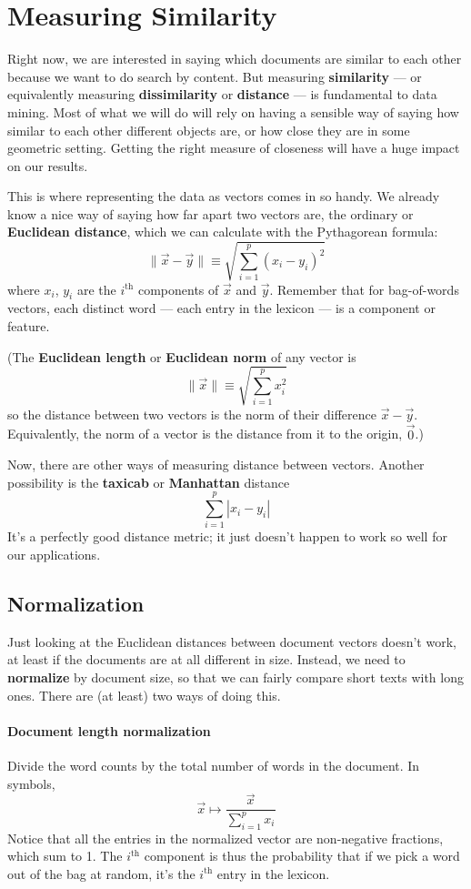 \documentclass{article}
\begin{document}
\section{Measuring Similarity}

Right now, we are interested in saying which documents are similar to each
other because we want to do search by content.  But measuring {\bf similarity}
--- or equivalently measuring {\bf dissimilarity} or {\bf distance} --- is
fundamental to data mining.  Most of what we will do will rely on having a
sensible way of saying how similar to each other different objects are, or how
close they are in some geometric setting.  Getting the right measure of
closeness will have a huge impact on our results.

This is where representing the data as vectors comes in so handy.  We already
know a nice way of saying how far apart two vectors are, the ordinary or {\bf
  Euclidean distance}, which we can calculate with the Pythagorean formula:
\[
\| \vec{x} - \vec{y} \| \equiv \sqrt{\sum_{i=1}^{p}{{\left(x_i - y_i\right)}^2}}
\]
where $x_i$, $y_i$ are the $i^{\mathrm{th}}$ components of $\vec{x}$ and
$\vec{y}$.  Remember that for bag-of-words vectors, each distinct word --- each
entry in the lexicon --- is a component or feature.

(The {\bf Euclidean length} or {\bf Euclidean norm} of any vector is
\[
\| \vec{x} \| \equiv \sqrt{\sum_{i=1}^{p}{{x_i^2}}}
\]
so the distance between two vectors is the norm of their difference $\vec{x} -
\vec{y}$.  Equivalently, the norm of a vector is the distance from it to the
origin, $\vec{0}$.)

Now, there are other ways of measuring distance between vectors.  Another
possibility is the {\bf taxicab} or {\bf Manhattan} distance
\[
\sum_{i=1}^{p}{|x_i - y_i|}
\]
It's a perfectly good distance metric; it just doesn't happen to work so well
for our applications.

\subsection{Normalization}

Just looking at the Euclidean distances between document vectors doesn't work,
at least if the documents are at all different in size.
Instead, we need to {\bf normalize} by document size, so that we can fairly
compare short texts with long ones.  There are (at least) two ways of doing
this.

\paragraph*{Document length normalization} Divide the word counts by the total
number of words in the document.  In symbols,
\[
\vec{x} \mapsto \frac{\vec{x}}{\sum_{i=1}^{p}{x_i}}
\]
Notice that all the entries in the normalized vector are non-negative
fractions, which sum to 1.  The $i^{\mathrm{th}}$ component is thus the
probability that if we pick a word out of the bag at random, it's the
$i^{\mathrm{th}}$ entry in the lexicon.
\end{document}
